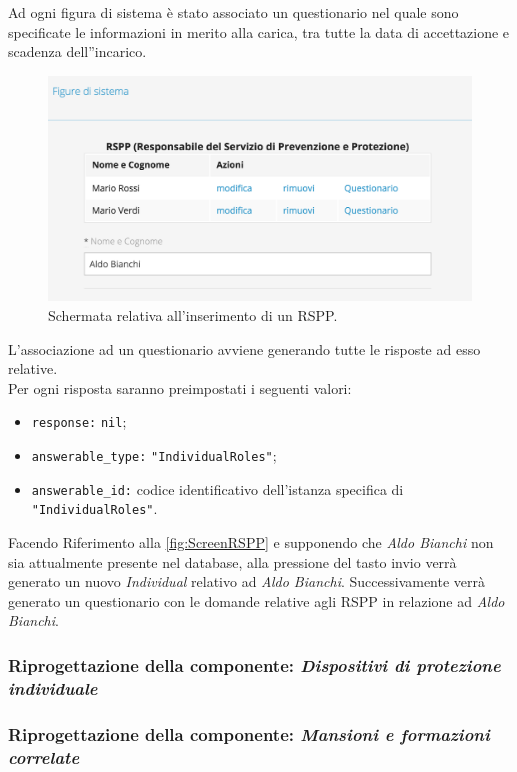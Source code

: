 	Ad ogni figura di sistema è stato associato un questionario nel quale sono specificate le informazioni in merito alla carica, tra tutte la data di accettazione e scadenza dell''incarico.
	\begin{figure}[H]
		\begin{center}
			\includegraphics[width=12cm]{Pics/RemoteTrueRSPP.png}
			\caption{
				Schermata relativa all'inserimento di un RSPP.}
			\label{fig:ScreenRSPP}
		\end{center}
	\end{figure}	
	  L'associazione ad un questionario avviene generando tutte le risposte ad esso relative.\\
	  Per ogni risposta saranno preimpostati i seguenti valori:
	  \begin{itemize}
		  \item \texttt{response:} \texttt{nil};
		  \item \texttt{answerable\_type:} \texttt{"IndividualRoles"};
		  \item \texttt{answerable\_id:} codice identificativo dell'istanza specifica di \texttt{"IndividualRoles"}.
	  \end{itemize}

	Facendo Riferimento alla \autoref{fig:ScreenRSPP} e  supponendo che \textit{Aldo Bianchi} non sia attualmente presente nel database, alla pressione del tasto invio verrà generato un nuovo \textit{Individual} relativo ad \textit{Aldo Bianchi}. Successivamente verrà generato un questionario con le domande relative agli RSPP in relazione ad \textit{Aldo Bianchi}.
	
\newpage
\subsubsection{Riprogettazione della componente: \textit{Dispositivi di protezione individuale}}
\newpage
\subsubsection{Riprogettazione della componente: \textit{Mansioni e formazioni correlate}}
\newpage
